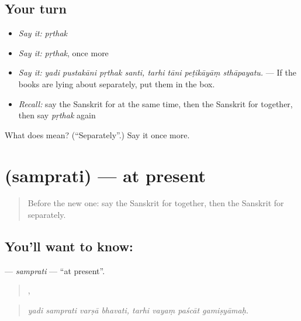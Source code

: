 \subsection*{Your turn}
\begin{itemize}
\raggedright
  \item \emph{Say it:} \emph{pṛthak}
  \item \emph{Say it:} \emph{pṛthak}, once more
  \item \emph{Say it:} \emph{yadi pustakāni pṛthak santi, tarhi tāni peṭikāyāṃ sthāpayatu.} — If the books are lying about separately, put them in the box.
  \item \emph{Recall:} say the Sanskrit for at the same time, then the Sanskrit for together, then say \emph{pṛthak} again
\end{itemize}

\begin{tcolorbox}[breakable,colback=teal!4,colframe=teal!35!black,title={Before you move on}]
What does  mean? (\textquotedblleft{}Separately\textquotedblright{}.) Say it once more.
\end{tcolorbox}
\section[\texorpdfstring{\sk{सम्प्रति} (samprati)}{सम्प्रति (samprati)}]{ (samprati) — at present}

\label{lesson:SA-C544-samprati}



\begin{quote}
Before the new one: say the Sanskrit for together, then the Sanskrit for separately.
\end{quote}

\subsection*{You'll want to know: }
\textbf{} — \emph{samprati} — \textquotedblleft{}at present\textquotedblright{}.

\begin{quote}
   ,    
\end{quote}

\begin{quote}
\emph{yadi samprati varṣā bhavati, tarhi vayaṃ paścāt gamiṣyāmaḥ.}
\end{quote}

